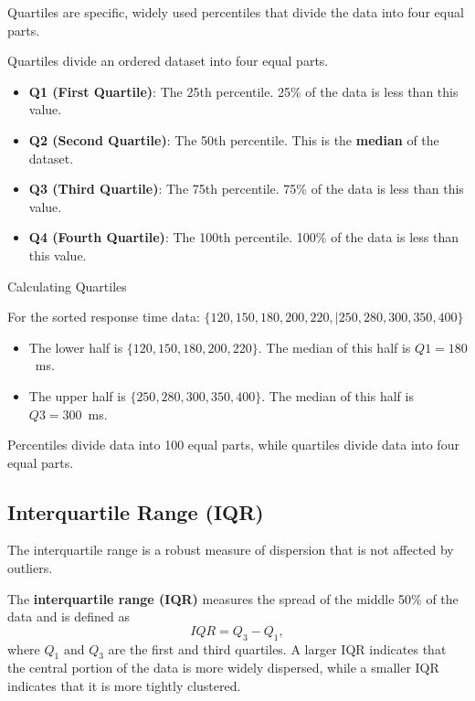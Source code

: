 Quartiles are specific, widely used percentiles that divide the data into four equal parts.

\begin{definition}[Quartiles]

Quartiles divide an ordered dataset into four equal parts.

\begin{itemize}
    \item \textbf{Q1 (First Quartile)}: The 25th percentile. 25\% of the data is less than this value.
    \item \textbf{Q2 (Second Quartile)}: The 50th percentile. This is the \textbf{median} of the dataset.
    \item \textbf{Q3 (Third Quartile)}: The 75th percentile. 75\% of the data is less than this value.
    \item \textbf{Q4 (Fourth Quartile)}: The 100th percentile. 100\% of the data is less than this value.
\end{itemize}
\end{definition}

\begin{example} Calculating Quartiles

For the sorted response time data: $\{120, 150, 180, 200, 220, | 250, 280, 300, 350, 400\}$
\begin{itemize}
    \item The lower half is $\{120, 150, 180, 200, 220\}$. The median of this half is $Q1 = 180$~ms.
    \item The upper half is $\{250, 280, 300, 350, 400\}$. The median of this half is $Q3 = 300$~ms.
\end{itemize}
\end{example}

Percentiles divide data into 100 equal parts, while quartiles divide data into four equal parts.

\subsection*{Interquartile Range (IQR)}

The interquartile range is a robust measure of dispersion that is not affected by outliers.

\begin{definition}
    The \textbf{interquartile range (IQR)} measures the spread of the middle 50\% of the data and is defined as
    $$
    IQR = Q_3 - Q_1,
    $$
    where $Q_1$ and $Q_3$ are the first and third quartiles. A larger IQR indicates that the central portion of the data is more widely dispersed, while a smaller IQR indicates that it is more tightly clustered.
    \end{definition}
    

